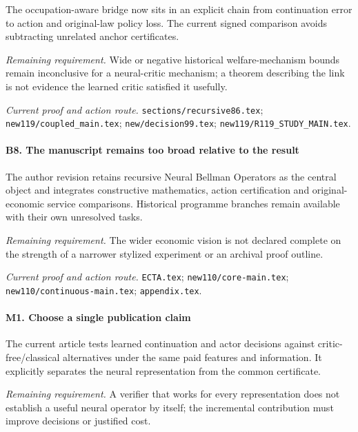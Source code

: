 The occupation-aware bridge now sits in an explicit chain from continuation error to action and original-law policy loss. The current signed comparison avoids subtracting unrelated anchor certificates.

\par\emph{Remaining requirement.} Wide or negative historical welfare-mechanism bounds remain inconclusive for a neural-critic mechanism; a theorem describing the link is not evidence the learned critic satisfied it usefully.

\par\emph{Current proof and action route.} \nolinkurl{sections/recursive86.tex}; \nolinkurl{new119/coupled_main.tex}; \nolinkurl{new/decision99.tex}; \nolinkurl{new119/R119_STUDY_MAIN.tex}.

\paragraph{B8. The manuscript remains too broad relative to the result}

The author revision retains recursive Neural Bellman Operators as the central object and integrates constructive mathematics, action certification and original-economic service comparisons. Historical programme branches remain available with their own unresolved tasks.

\par\emph{Remaining requirement.} The wider economic vision is not declared complete on the strength of a narrower stylized experiment or an archival proof outline.

\par\emph{Current proof and action route.} \nolinkurl{ECTA.tex}; \nolinkurl{new110/core-main.tex}; \nolinkurl{new110/continuous-main.tex}; \nolinkurl{appendix.tex}.

\paragraph{M1. Choose a single publication claim}

The current article tests learned continuation and actor decisions against critic-free/\allowbreak{}classical alternatives under the same paid features and information. It explicitly separates the neural representation from the common certificate.

\par\emph{Remaining requirement.} A verifier that works for every representation does not establish a useful neural operator by itself; the incremental contribution must improve decisions or justified cost.

